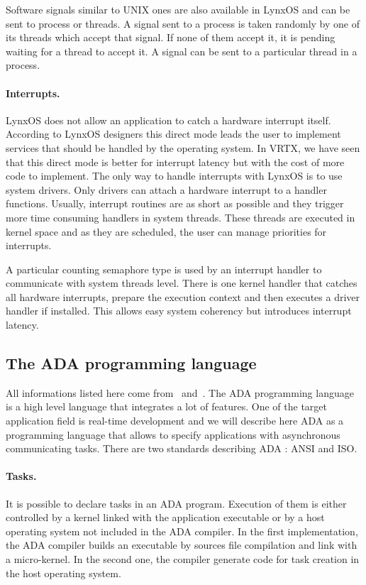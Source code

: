 \documentclass[10pt]{report}
\begin{document}
Software signals similar to UNIX ones are also available in LynxOS and can be sent to process or threads. A signal sent to a
process is taken randomly by one of its threads which accept that signal. If none of them accept it, it is pending waiting
for a thread to accept it. A signal can be sent to a particular thread in a process.

\paragraph{Interrupts.} LynxOS does not allow an application to catch a hardware interrupt itself. According to LynxOS designers
this direct mode leads the user to implement services that should be handled by the operating system. In VRTX, we have seen
that this direct mode is better for interrupt latency but with the cost of more code to implement. The only way to handle
interrupts with LynxOS is to use system drivers. Only drivers can attach a hardware interrupt to a handler functions. Usually,
interrupt routines are as short as possible and they trigger more time consuming handlers in system threads. These threads are
executed in kernel space and as they are scheduled, the user can manage priorities for interrupts.

A particular counting semaphore type is used by an interrupt handler to communicate with system threads level. There is one
kernel handler that catches all hardware interrupts, prepare the execution context and then executes a driver handler if installed.
This allows easy system coherency but introduces interrupt latency.

\subsection{The ADA programming language}

All informations listed here come from~\cite{Booch:86} and~\cite{ADA:83}. The ADA programming language is a high level language
that integrates a lot of features. One of the target application field is real-time development and we will describe here ADA
as a programming language that allows to specify applications with asynchronous communicating tasks. There are two standards
describing ADA : ANSI and ISO.

\paragraph{Tasks.} It is possible to declare tasks in an ADA program. Execution of them is either controlled by a kernel linked
with the application executable or by a host operating system not included in the ADA compiler. In the first implementation,
the ADA compiler builds an executable by sources file compilation and link with a micro-kernel. In the second one, the compiler
generate code for task creation in the host operating system.
\end{document}
